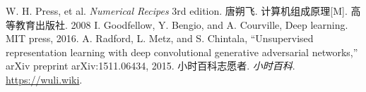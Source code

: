 \begin{thebibliography}{99}
W. H. Press, et al. \textsl{Numerical Recipes} 3rd edition. 
唐朔飞. 计算机组成原理[M]. 高等教育出版社. 2008
I. Goodfellow, Y. Bengio, and A. Courville, Deep learning. MIT press, 2016.
A. Radford, L. Metz, and S. Chintala, “Unsupervised representation learning with deep convolutional generative adversarial networks,” arXiv preprint arXiv:1511.06434, 2015.
小时百科志愿者. \textsl{小时百科}. \href{https://wuli.wiki}{https://wuli.wiki}. 
\end{thebibliography}
